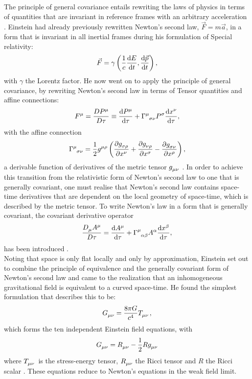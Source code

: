 \documentclass[a4paper, 11pt]{FSKH_623_Report}
\numberwithin{equation}{section}
\begin{document}
The principle of general covariance entails rewriting the laws of physics in terms of quantities that are invariant in reference frames with an arbitrary acceleration \citep{ITC}. Einstein had already previously rewritten Newton's second law, $\vec{F}=m\vec{a}$, in a form that is invariant in all inertial frames during his formulation of Special relativity: $$\vec{F}=\gamma\left(\frac{1}{c}\dv{E}{t},\dv{\vec{p}}{t}\right),$$with $\gamma$ the Lorentz factor. He now went on to apply the principle of general covariance, by rewriting Newton's second law in terms of Tensor quantities and affine connections: $$\tensor{F}{^\mu}=\frac{D\tensor{P}{^\mu}}{D\tau}\equiv\dv{\tensor{P}{^\mu}}{\tau}+\tensor{\Gamma}{^\mu_{\sigma\nu}}\tensor{P}{^\sigma}\dv{\tensor{x}{^\nu}}{\tau},$$ with the affine connection $$\tensor{\Gamma}{^\mu_{\sigma\nu}}=\frac{1}{2}\tensor{g}{^{\mu\rho}}\left(\pdv{\tensor{g}{_{\sigma\rho}}}{x^\nu}+\pdv{\tensor{g}{_{\nu\rho}}}{x^\sigma}-\pdv{\tensor{g}{_{\sigma\nu}}}{x^\rho}\right),$$ a derivable function of derivatives of the metric tensor $\tensor{g}{_{\mu\nu}}$ \citep{ITC}. In order to achieve this transition from the relativistic form of Newton's second law to one that is generally covariant, one must realise that Newton's second law contains space-time derivatives that are dependent on the local geometry of space-time, which is described by the metric tensor. To write Newton's law in a form that is generally covariant, the covariant derivative operator $$\frac{\tensor{D}{_\mu}\tensor{A}{^\mu}}{D\tau}=\dv{\tensor{A}{^\mu}}{\tau}+\tensor{\Gamma}{^\mu_{\alpha\beta}}\tensor{A}{^\alpha}\dv{\tensor{x}{^{\beta}}}{\tau},$$ has been introduced \citep{GRFD}. \\ 
Noting that space is only flat locally and only by approximation, Einstein set out to combine the principle of equivalence and the generally covariant form of Newton's second law and came to the realization that an inhomogeneous gravitational field is equivalent to a curved space-time. He found the simplest formulation that describes this to be:
$$\tensor{G}{_{\mu\nu}}=\frac{8\pi G}{c^{4}}\tensor{T}{_{\mu\nu}},$$
which forms the ten independent Einstein field equations, with 
$$\tensor{G}{_{\mu\nu}}=\tensor{R}{_{\mu\nu}}-\frac{1}{2}R\tensor{g}{_{\mu\nu}}$$ where $\tensor{T}{_{\mu\nu}}$ is the stress-energy tensor, $\tensor{R}{_{\mu\nu}}$ the Ricci tensor and $R$ the Ricci scalar \citep{ITC}. These equations reduce to Newton's equations in the weak field limit.
\end{document}
